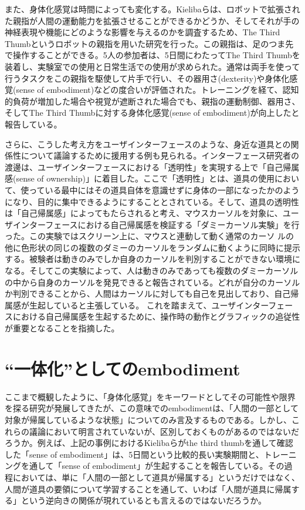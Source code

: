 また、身体化感覚は時間によっても変化する。Kielibaら\cite{kieliba2021robotic}は、ロボットで拡張された親指が人間の運動能力を拡張させることができるかどうか、そしてそれが手の神経表現や機能にどのような影響を与えるのかを調査するため、The Third Thumbというロボットの親指を用いた研究を行った。この親指は、足のつま先で操作することができる。5人の参加者は、5日間にわたってThe Third Thumbを装着し、実験室での使用と日常生活での使用が求められた。通常は両手を使って行うタスクをこの親指を駆使して片手で行い、その器用さ(dexterity)や身体化感覚(sense of embodiment)などの度合いが評価された。トレーニングを経て、認知的負荷が増加した場合や視覚が遮断された場合でも、親指の運動制御、器用さ、そしてThe Third Thumbに対する身体化感覚(sense of embodiment)が向上したと報告している。

さらに、こうした考え方をユーザインターフェースのような、身近な道具との関係性について議論するために援用する例も見られる。インターフェース研究者の渡邊は、ユーザインターフェースにおける「透明性」を実現する上で「自己帰属感(sense of ownership)」に着目した\cite{Watanabe2017}。ここで「透明性」とは、道具の使用において、使っている最中にはその道具自体を意識せずに身体の一部になったかのようになり、目的に集中できるようにすることとされている。そして、道具の透明性は「自己帰属感」によってもたらされると考え、マウスカーソルを対象に、ユーザインターフェースにおける自己帰属感を検証する「ダミーカーソル実験」を行った\cite{Watanabe2013}。この実験ではスクリーン上に、マウスと連動して動く通常のカーソ
ルの他に色形状の同じの複数のダミーのカーソルをランダムに動くように同時に提示する。被験者は動きのみでしか自身のカーソルを判別することができない環境になる。そしてこの実験によって、人は動きのみであっても複数のダミーカーソルの中から自身のカーソルを発見できると報告されている。どれが自分のカーソルか判別できることから、人間はカーソルに対しても自己を見出しており、自己帰属感が生起していると主張している。
これを踏まえて、ユーザインターフェースにおける自己帰属感を生起するために、操作時の動作とグラフィックの追従性が重要となることを指摘した。

\section{``一体化''としてのembodiment}
ここまで概観したように、「身体化感覚」をキーワードとしてその可能性や限界を探る研究が発展してきたが、この意味でのembodimentは、「人間の一部として対象が帰属しているような状態」についてのみ言及するものである。しかし、これらの議論において明言されていないが、区別しておくものがあるのではないだろうか。例えば、上記の事例におけるKielibaらがthe third thumbを通して確認した「sense of embodiment」は、5日間という比較的長い実験期間と、トレーニングを通して「sense of embodiment」が生起することを報告している。その過程においては、単に「人間の一部として道具が帰属する」というだけではなく、人間が道具の要領について学習することを通して、いわば「人間が道具に帰属する」という逆向きの関係が現れているとも言えるのではないだろうか。

